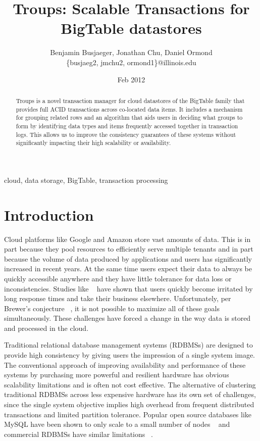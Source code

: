\documentclass[10pt,final,journal]{IEEEtran}
\begin{document}
\title{Troups: Scalable Transactions for BigTable datastores}
\author{Benjamin Busjaeger, Jonathan Chu, Daniel Ormond \\
\{busjaeg2, jmchu2, ormond1\}@illinois.edu}
\date{Feb 2012}
\maketitle

\begin{abstract}
Troups is a novel transaction manager for cloud datastores of the BigTable family that provides full ACID transactions across co-located data items. It includes a mechanism for grouping related rows and an algorithm that aids users in deciding what groups to form by identifying data types and items frequently accessed together in transaction logs. This allows us to improve the consistency guarantees of these systems without significantly impacting their high scalability or availability.
\end{abstract}

\begin{IEEEkeywords}
cloud, data storage, BigTable, transaction processing
\end{IEEEkeywords}

\section{Introduction}
Cloud platforms like Google and Amazon store vast amounts of data. This is in part because they pool resources to efficiently serve multiple tenants and in part because the volume of data produced by applications and users has significantly increased in recent years. At the same time users expect their data to always be quickly accessible anywhere and they have little tolerance for data loss or inconsistencies. Studies like ~\cite{Ramsay:1998} have shown that users quickly become  irritated by long response times and take their business elsewhere. Unfortunately, per Brewer's conjecture ~\cite{gilbert2002brewer}, it is not possible to maximize all of these goals simultaneously. These challenges have forced a change in the way data is stored and processed in the cloud.

Traditional relational database management systems (RDBMSs) are designed to provide high consistency by giving users the impression of a single system image. The conventional approach of improving availability and performance of these systems by purchasing more powerful and resilient hardware has obvious scalability limitations and is often not cost effective. The alternative of clustering traditional RDBMSs across less expensive hardware has its own set of challenges, since the single system objective implies high overhead from frequent distributed transactions and limited partition tolerance. Popular open source databases like MySQL have been shown to only scale to a small number of nodes ~\cite{Malkowski:2010:EAD:1774088.1774449} and commercial RDBMSs have similar limitations ~\cite{Campbell:2010:ESF:1807167.1807280}.
\end{document}
